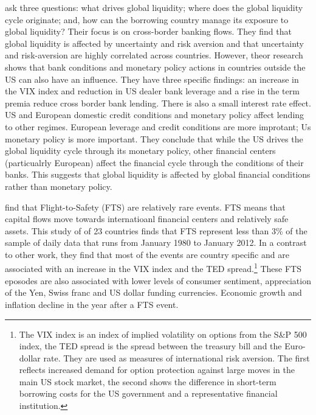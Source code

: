 \documentclass[12pt, a4paper, oneside]{article} %
\begin{document}
\citet{Cerutti2014} ask three questions:  what drives global liquidity; where does the global liquidity cycle originate; and, how can the borrowing country manage its exposure to global liquidity? Their focus is on cross-border banking flows. They find that global liquidity is affected by uncertainty and risk aversion and that uncertainty and risk-aversion are highly correlated across countries. However, theor research shows that bank conditions and monetary policy actions in countries outside the US can also have an influence. They have three specific findings:  an increase in the VIX index and reduction in US dealer bank leverage and a rise in the term premia reduce cross border bank lending.  There is also a small interest rate effect.  US and European domestic credit conditions and monetary policy affect lending to other regimes. European leverage and credit conditions are more improtant; Us monetary policy is more important.  They conclude that while the US drives the global liquidity cycle through its monetary policy, other financial centers (particualrly European) affect the financial cycle through the conditions of their banks. This suggests that global liquidity is affected by global financial conditions rather than monetary policy.

\citet{FTS} find that Flight-to-Safety (FTS)  are relatively rare events.  FTS means that capital flows move towards internatioanl financial centers and relatively safe assets.  This study of of 23 countries finds that FTS represent less than 3\% of the sample of daily data that runs from January 1980 to January 2012.  In a contrast to other work, they find that most of the events are country specific and are associated with an increase in the VIX index and the TED spread.\footnote{The VIX index is an index of implied volatility on options from the S\&P 500 index, the TED spread is the spread between the treasury bill and the Euro-dollar rate.  They are used as measures of international risk aversion.  The first reflects increased demand for option protection against large moves in the main US stock market, the second shows the difference in short-term borrowing costs for the US government and a representative financial institution.}  These FTS eposodes are also associated with lower levels of consumer sentiment, appreciation of the  Yen, Swiss franc and US dollar funding currencies. %
Economic growth and inflation decline in the year after a FTS event. 
\end{document}
